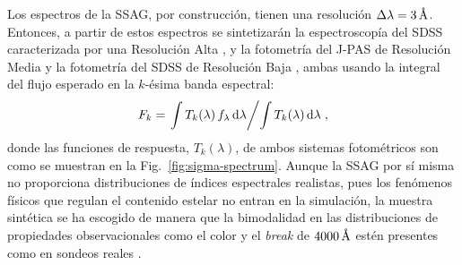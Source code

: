 Los espectros de la SSAG, por construcción, tienen una resolución $\Delta\lambda=\unit[3]{\AA}$.
Entonces, a partir de estos espectros se sintetizarán la espectroscopía del SDSS caracterizada por
una Resolución Alta \citep[RA: $\Delta\lambda=1\,\text{\AA}$][]{Strauss2002}, y la fotometría del
J-PAS de Resolución Media \citep[RM: $\Delta\lambda=140\,\text{\AA}$][]{Marin-Franch2015} y la
fotometría del SDSS de Resolución Baja \citep[RB: $\Delta\lambda\sim1000\,{\AA}$][]{Doi2010}, ambas
usando la integral del flujo esperado en la $k$-ésima banda espectral:
%
\begin{equation}\label{ec:flujo-esperado}
F_k = \left.\int T_k(\lambda)\,f_\lambda\,\text{d}\lambda\middle/\int T_k(\lambda)\,\text{d}\lambda\right.,
\end{equation}
%
donde las funciones de respuesta, $T_k(\lambda)$, de ambos sistemas fotométricos son como se
muestran en la Fig.~\ref{fig:sigma-spectrum}. Aunque la SSAG por sí misma no proporciona
distribuciones de índices espectrales realistas, pues los fenómenos físicos que regulan el contenido
estelar no entran en la simulación, la muestra sintética se ha escogido de manera que la bimodalidad
en las distribuciones de propiedades observacionales como el color y el \emph{break} de
$\unit[4000]{\AA}$ estén presentes como en sondeos reales \citep{Strateva2001, Kauffmann2003,
Baldry2004}.

